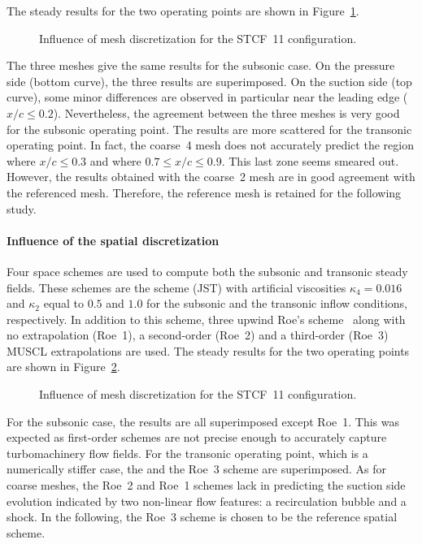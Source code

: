 The steady results for the two operating points are shown 
in Figure~\ref{fig:stcf11_mesh_convergence}.
\begin{figure}[htp]
  \centering
  \caption{Influence of mesh discretization for the STCF~11 configuration.}
  \label{fig:stcf11_mesh_convergence}
\end{figure}
The three meshes give the same results for the subsonic case. On the
pressure side (bottom curve), the three results are superimposed. On the suction side
(top curve),
some minor differences are observed in particular near the leading edge
($x / c \leq 0.2$). Nevertheless, the agreement
between the three meshes is very good for the subsonic operating point.
The results are more scattered for the transonic operating point. In fact,
the coarse~4 mesh does not accurately predict the region where $x / c \leq 0.3$
and where $0.7 \leq x / c \leq 0.9$. This last zone seems smeared out. 
However, the results
obtained with the coarse~2 mesh are in good agreement with the referenced mesh.
Therefore, the reference mesh is retained for the following study.

\paragraph{Influence of the spatial discretization}
Four space schemes are
used to compute both the subsonic and transonic steady fields. These
schemes are the \citet{Jameson1981} scheme (JST) with artificial
viscosities $\kappa_4 = 0.016$
and $\kappa_2$ equal to $0.5$ and $1.0$ for the subsonic and the transonic
inflow conditions, respectively. In addition to this scheme, three upwind
Roe's scheme~\cite{Roe1981} along with no extrapolation (Roe~1),
a second-order (Roe~2) and a third-order (Roe~3) 
MUSCL extrapolations are used.
The steady results for the two operating points are shown 
in Figure~\ref{fig:stcf11_space_scheme_convergence}.
\begin{figure}[htp]
  \centering
  \caption{Influence of mesh discretization for the STCF~11 configuration.}
  \label{fig:stcf11_space_scheme_convergence}
\end{figure}
For the subsonic case, the results are all superimposed except Roe~1. 
This was expected as first-order schemes
are not precise enough to accurately capture turbomachinery flow fields.
For the transonic operating point, which is a numerically stiffer case,
the \citet{Jameson1981} and the Roe~3 scheme are superimposed.
As for coarse meshes, the Roe~2 and Roe~1 schemes
lack in predicting the suction side evolution indicated
by two non-linear flow features: a recirculation
bubble and a shock. In the following,
the Roe~3 scheme is chosen to be the reference spatial scheme.
